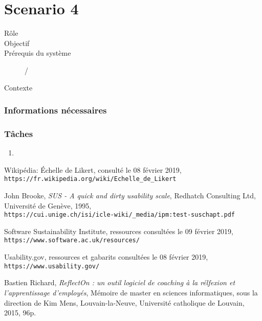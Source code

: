 \documentclass[a4paper, 11pt]{article}
\begin{document}
\section*{Scenario 4}
    \begin{description}
        \item[Rôle]
        \item[Objectif]
        \item[Prérequis du système] /
        \item[Contexte]
    \end{description}

    \subsubsection*{Informations nécessaires}

    \subsubsection*{Tâches}
        \begin{enumerate}
            \item
        \end{enumerate}

\newpage

\begin{thebibliography}{9}
    Wikipédia: \'Echelle de Likert, consulté le 08 février 2019,
    \\\texttt{https://fr.wikipedia.org/wiki/Echelle\_de\_Likert}

    John Brooke, \emph{SUS - A quick and dirty usability scale}, Redhatch Consulting Ltd, Université de Genève, 1995,
    \\\texttt{https://cui.unige.ch/isi/icle-wiki/\_media/ipm:test-suschapt.pdf}

    Software Sustainability Institute, ressources consultées le 09 février 2019,
    \\\texttt{https://www.software.ac.uk/resources/}

    Usability.gov, ressources et gabarits consultées le 08 février 2019,
    \\\texttt{https://www.usability.gov/}

    Bastien Richard, \textit{ReflectOn : un outil logiciel de coaching à la rélfexion et l'apprentissage d'employés}, Mémoire de master en sciences informatiques, sous la direction de Kim Mens, Louvain-la-Neuve, Université catholique de Louvain, 2015, 96p.

\end{thebibliography}
\end{document}
